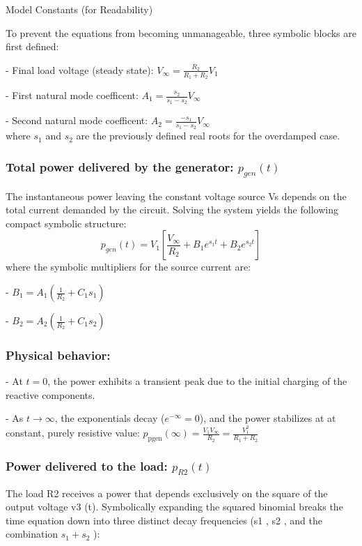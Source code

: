 \documentclass[energies,accept,oneauthor,pdftex]{Definitions/mdpi}
\begin{document}
Model Constants (for Readability)


To prevent the equations from becoming unmanageable, three symbolic blocks are first defined:

- Final load voltage (steady state): $V_{\infty} = \frac{R_2}{R_1+R_2}V_1$

- First natural mode  coefficent: $A_1 = \frac{s_2}{s_1-s_2}V_{\infty}$

- Second natural mode  coefficent: $A_2 = \frac{-s_1}{s_1-s_2}V_{\infty}$\\
where $s_1$ and $s_2$ are the previously defined real roots for the overdamped case.


\subsubsection*{Total power delivered by the generator: $p_{gen} (t)$}

The instantaneous power leaving the constant voltage source Vs depends on the total current demanded by the circuit. Solving the system yields the following compact symbolic
structure:
\[
p_{gen} (t) = V_1 \left[\frac{V_{\infty}}{R_2}+B_1e^{s_1t} + B_2 e^{s_2t} \right]
\]
where the symbolic multipliers for the source current are:

- $B_1 = A_1 \left(\frac{1}{R_2} + C_1 s_1\right)$

- $B_2 = A_2\left(\frac{1}{R_2} + C_1 s_2\right)$

\subsubsection*{Physical behavior:}

 - At $t = 0$, the power exhibits a transient peak due to the initial charging of the reactive components.

\noindent
- As $t \to \infty$, the exponentials decay ($e^ {-\infty} = 0$), and the power stabilizes at at constant, purely resistive value:
$p_{\mathrm{pgen}} (\infty) = \frac{V_1 V_{\infty}}{R_2} =
\frac{V_1^2}{R_1+R_2}$


\subsubsection*{Power delivered to the load: $p_{R2} (t)$}

The load R2 receives a power that depends exclusively on the square of the output voltage
v3 (t). Symbolically expanding the squared binomial breaks the time equation down into
three distinct decay frequencies (s1 , s2 , and the combination $s_1 + s_2$ ):
\end{document}
